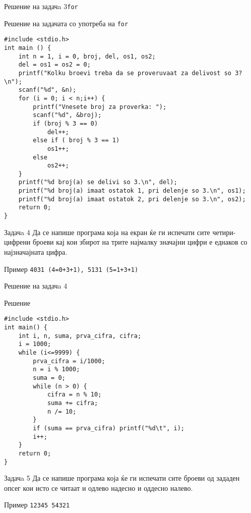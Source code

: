 \begin{frame}[fragile]{Решение на задачa 3}{\texttt{for}}
\begin{exampleblock}{Решение на задачата со употреба на \texttt{for}}
\begin{lstlisting}
#include <stdio.h> 
int main () { 
    int n = 1, i = 0, broj, del, os1, os2; 
    del = os1 = os2 = 0; 
    printf("Kolku broevi treba da se proveruvaat za delivost so 3?\n"); 
    scanf("%d", &n); 
    for (i = 0; i < n;i++) { 
        printf("Vnesete broj za proverka: "); 
        scanf("%d", &broj); 
        if (broj % 3 == 0) 
            del++; 
        else if ( broj % 3 == 1) 
            os1++; 
        else 
            os2++; 
    }
    printf("%d broj(a) se delivi so 3.\n", del); 
    printf("%d broj(a) imaat ostatok 1, pri delenje so 3.\n", os1); 
    printf("%d broj(a) imaat ostatok 2, pri delenje so 3.\n", os2); 
    return 0; 
}
\end{lstlisting}
\end{exampleblock}
\end{frame}

\begin{frame}[fragile]{Задачa 4}
Да се напише програма која на екран ќе ги испечати сите четири-цифрени броеви кај кои збирот на трите 
најмалку значајни цифри е еднаков со најзначајната цифра.
\begin{exampleblock}{Пример}
	\texttt{4031 (4=0+3+1), 5131 (5=1+3+1)}
\end{exampleblock}
\end{frame}

\begin{frame}[fragile]{Решение на задачa 4}
\begin{exampleblock}{Решение}
	\begin{lstlisting}
#include <stdio.h> 
int main() { 
    int i, n, suma, prva_cifra, cifra; 
    i = 1000; 
    while (i<=9999) { 
        prva_cifra = i/1000; 
        n = i % 1000; 
        suma = 0; 
        while (n > 0) { 
            cifra = n % 10; 
            suma += cifra; 
            n /= 10; 
        } 
        if (suma == prva_cifra) printf("%d\t", i); 
        i++; 
    } 
    return 0; 
}
	\end{lstlisting}
\end{exampleblock}
\end{frame}

\begin{frame}[fragile]{Задачa 5}
Да се напише програма која ќе ги испечати сите броеви од зададен опсег кои исто
се читаат и одлево надесно и оддесно налево.
\begin{exampleblock}{Пример}
\texttt{12345    54321}
\end{exampleblock}
\end{frame}


